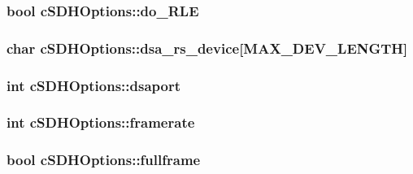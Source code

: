 \hypertarget{classcSDHOptions_ab285c659c8f86f4dd2c1582f9a5e3608}{
\subsubsection[{do\-\_\-\-R\-L\-E}]{\setlength{\rightskip}{0pt plus 5cm}bool {\bf c\-S\-D\-H\-Options\-::do\-\_\-\-R\-L\-E}}}\label{classcSDHOptions_ab285c659c8f86f4dd2c1582f9a5e3608}
\hypertarget{classcSDHOptions_a8d9d3490f0a39e8982cf9ae4c77f2147}{
\subsubsection[{dsa\-\_\-rs\-\_\-device}]{\setlength{\rightskip}{0pt plus 5cm}char {\bf c\-S\-D\-H\-Options\-::dsa\-\_\-rs\-\_\-device}\mbox{[}{\bf \-M\-A\-X\-\_\-\-D\-E\-V\-\_\-\-L\-E\-N\-G\-T\-H}\mbox{]}}}\label{classcSDHOptions_a8d9d3490f0a39e8982cf9ae4c77f2147}
\hypertarget{classcSDHOptions_a0de19c3e4d29f927c9bd8a4071a8e13d}{
\subsubsection[{dsaport}]{\setlength{\rightskip}{0pt plus 5cm}int {\bf c\-S\-D\-H\-Options\-::dsaport}}}\label{classcSDHOptions_a0de19c3e4d29f927c9bd8a4071a8e13d}
\hypertarget{classcSDHOptions_a7bdd78ad26a17faeceec15e2431a1c3e}{
\subsubsection[{framerate}]{\setlength{\rightskip}{0pt plus 5cm}int {\bf c\-S\-D\-H\-Options\-::framerate}}}\label{classcSDHOptions_a7bdd78ad26a17faeceec15e2431a1c3e}
\hypertarget{classcSDHOptions_a9c8cd3c89d1175f2a75afbbb119a7f9b}{
\subsubsection[{fullframe}]{\setlength{\rightskip}{0pt plus 5cm}bool {\bf c\-S\-D\-H\-Options\-::fullframe}}}\label{classcSDHOptions_a9c8cd3c89d1175f2a75afbbb119a7f9b}
